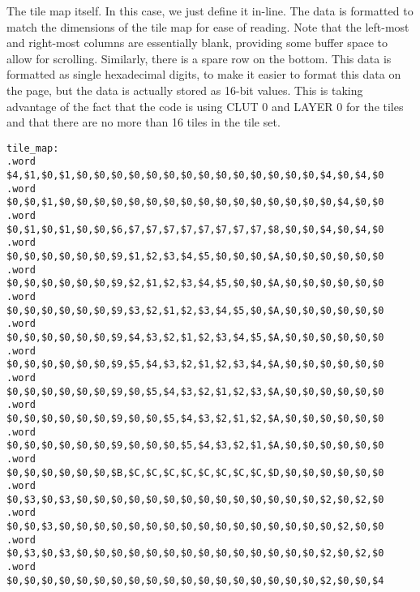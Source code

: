 The tile map itself. In this case, we just define it in-line. The data is formatted to match the dimensions of the tile map for ease of reading. Note that the left-most and right-most columns are essentially blank, providing some buffer space to allow for scrolling. Similarly, there is a spare row on the bottom. This data is formatted as single hexadecimal digits, to make it easier to format this data on the page, but the data is actually stored as 16-bit values. This is taking advantage of the fact that the code is using CLUT 0 and LAYER 0 for the tiles and that there are no more than 16 tiles in the tile set.

\begin{verbatim}
tile_map:
.word $4,$1,$0,$1,$0,$0,$0,$0,$0,$0,$0,$0,$0,$0,$0,$0,$0,$0,$4,$0,$4,$0
.word $0,$0,$1,$0,$0,$0,$0,$0,$0,$0,$0,$0,$0,$0,$0,$0,$0,$0,$0,$4,$0,$0
.word $0,$1,$0,$1,$0,$0,$6,$7,$7,$7,$7,$7,$7,$7,$7,$8,$0,$0,$4,$0,$4,$0
.word $0,$0,$0,$0,$0,$0,$9,$1,$2,$3,$4,$5,$0,$0,$0,$A,$0,$0,$0,$0,$0,$0
.word $0,$0,$0,$0,$0,$0,$9,$2,$1,$2,$3,$4,$5,$0,$0,$A,$0,$0,$0,$0,$0,$0
.word $0,$0,$0,$0,$0,$0,$9,$3,$2,$1,$2,$3,$4,$5,$0,$A,$0,$0,$0,$0,$0,$0
.word $0,$0,$0,$0,$0,$0,$9,$4,$3,$2,$1,$2,$3,$4,$5,$A,$0,$0,$0,$0,$0,$0
.word $0,$0,$0,$0,$0,$0,$9,$5,$4,$3,$2,$1,$2,$3,$4,$A,$0,$0,$0,$0,$0,$0
.word $0,$0,$0,$0,$0,$0,$9,$0,$5,$4,$3,$2,$1,$2,$3,$A,$0,$0,$0,$0,$0,$0
.word $0,$0,$0,$0,$0,$0,$9,$0,$0,$5,$4,$3,$2,$1,$2,$A,$0,$0,$0,$0,$0,$0
.word $0,$0,$0,$0,$0,$0,$9,$0,$0,$0,$5,$4,$3,$2,$1,$A,$0,$0,$0,$0,$0,$0
.word $0,$0,$0,$0,$0,$0,$B,$C,$C,$C,$C,$C,$C,$C,$C,$D,$0,$0,$0,$0,$0,$0
.word $0,$3,$0,$3,$0,$0,$0,$0,$0,$0,$0,$0,$0,$0,$0,$0,$0,$0,$2,$0,$2,$0
.word $0,$0,$3,$0,$0,$0,$0,$0,$0,$0,$0,$0,$0,$0,$0,$0,$0,$0,$0,$2,$0,$0
.word $0,$3,$0,$3,$0,$0,$0,$0,$0,$0,$0,$0,$0,$0,$0,$0,$0,$0,$2,$0,$2,$0
.word $0,$0,$0,$0,$0,$0,$0,$0,$0,$0,$0,$0,$0,$0,$0,$0,$0,$0,$2,$0,$0,$4
\end{verbatim}
